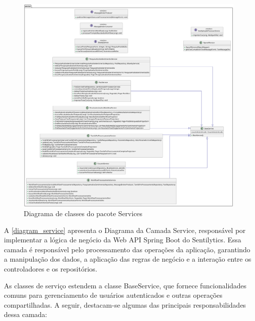 \documentclass[
	12pt,				%
	oneside,			%
	a4paper,			%
	english,			%
	french,				%
	spanish,			%
	brazil				%
	]{abntex2}
\begin{document}
\begin{figure}[htbp]
\hypertarget{diagram_service}{%
\caption{Diagrama de classes do pacote Services}\label{diagram_service}
\begin{center}
\includegraphics[scale=0.2]{imagens/sentilytics/diagramas/classes/service-classes.png}
\end{center}
}
\end{figure}

A \autoref{diagram_service} apresenta o Diagrama da Camada Service,
responsável por implementar a lógica de negócio da Web API Spring Boot
do Sentilytics. Essa camada é responsável pelo processamento das
operações da aplicação, garantindo a manipulação dos dados, a aplicação
das regras de negócio e a interação entre os controladores e os
repositórios.

As classes de serviço estendem a classe BaseService, que fornece
funcionalidades comuns para gerenciamento de usuários autenticados e
outras operações compartilhadas. A seguir, destacam-se algumas das
principais responsabilidades dessa camada:
\end{document}
